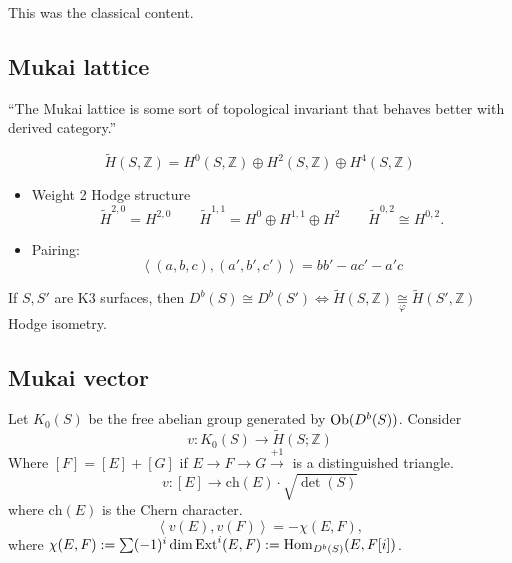 This was the classical content.

\subsection{Mukai lattice}
\label{subsection-Mukai-lattice}

``The Mukai lattice is some sort of
topological invariant that behaves better
with derived category.''

$$
\tilde{H}(S,\mathbb{Z})
=H^{0}(S,\mathbb{Z})\oplus
H^{2}(S,\mathbb{Z})\oplus H^{4}(S,\mathbb{Z})
$$
\begin{itemize}
\item Weight 2 Hodge structure
$$
\tilde{H}^{2,0}=H^{2,0}\qquad
\tilde{H}^{1,1}=H^0\oplus H^{1,1}\oplus H^2
\qquad \tilde{H}^{0,2}\cong H^{0,2}.
$$
\item Pairing:
$$
\left\langle{}(a,b,c),(a',b',c')\right\rangle{}=bb'-ac'-a'c
$$
\end{itemize}

\begin{theorem}
\label{theorem-Mukai-Orlov}
If $S,S'$ are K3 surfaces, then $D^b(S) \cong
D^b(S')\iff
\tilde{H}(S,\mathbb{Z})\underset{\varphi}
{\cong}\tilde{H}(S',\mathbb{Z})$
Hodge
isometry.
\end{theorem}

\subsection{Mukai vector}
\label{subsection-Mukai-vector}

Let $K_0(S)$ be the free abelian group
generated by $\mathop{\mathrm{Ob}}\nolimits(D^b(S))$. Consider
$$
v:K_0(S)\to \tilde{H}(S;\mathbb{Z})
$$
Where $[F]=[E]+[G]$ if $E \to F \to G
\xrightarrow{+1}$ is a distinguished
triangle.
$$
v:[E] \to \text{ch}(E)\cdot \sqrt{\det(S)}
$$
where $\text{ch}(E)$ is the Chern character.
$$
\left\langle{}v(E),v(F)\right\rangle{}=-\chi(E,F),
$$
where
$\chi(E,F):=\sum(-1)^i\dim\text{Ext}^i(E,F):=
\mathop{\mathrm{Hom}}\nolimits_{D^b(S)}(E,F[i])$.

